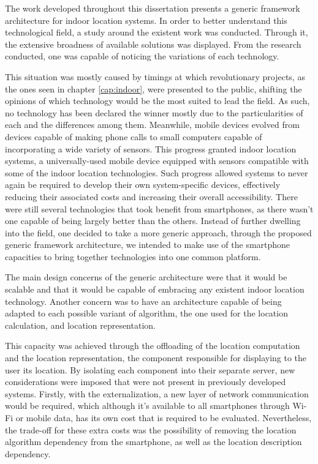 \label{cap:conclusions}

The work developed throughout this dissertation presents a generic framework architecture for indoor location systems. In order to better understand this technological field, a study around the existent work was conducted. Through it, the extensive broadness of available solutions was displayed. From the research conducted, one was capable of noticing the variations of each technology. 
 
 
This situation was mostly caused by timings at which revolutionary projects, as the ones seen in chapter \ref{cap:indoor}, were presented to the public, shifting the opinions of which technology would be the most suited to lead the field. As such, no technology has been declared the winner mostly due to the particularities of each and the differences among them. Meanwhile, mobile devices evolved from devices capable of making phone calls to small computers capable of incorporating a wide variety of sensors. This progress granted indoor location systems, a universally-used mobile device equipped with sensors compatible with some of the indoor location technologies. Such progress allowed systems to never again be required to develop their own system-specific devices, effectively reducing their associated costs and increasing their overall accessibility. There were still several technologies that took benefit from smartphones, as there wasn't one capable of being largely better than the others. Instead of further dwelling into the field, one decided to take a more generic approach, through the proposed generic framework architecture, we intended to make use of the smartphone capacities to bring together technologies into one common platform. 
 
 
The main design concerns of the generic architecture were that it would be scalable and that it would be capable of embracing any existent indoor location technology. Another concern was to have an architecture capable of being adapted to each possible variant of algorithm, the one used for the location calculation, and location representation. 

This capacity was achieved through the offloading of the location computation and the location representation, the component responsible for displaying to the user its location. By isolating each component into their separate server, new considerations were imposed that were not present in previously developed systems. Firstly, with the externalization, a new layer of network communication would be required, which although it's available to all smartphones through Wi-Fi or mobile data, has its own cost that is required to be evaluated. Nevertheless, the trade-off for these extra costs was the possibility of removing the location algorithm dependency from the smartphone, as well as the location description dependency.  
 
